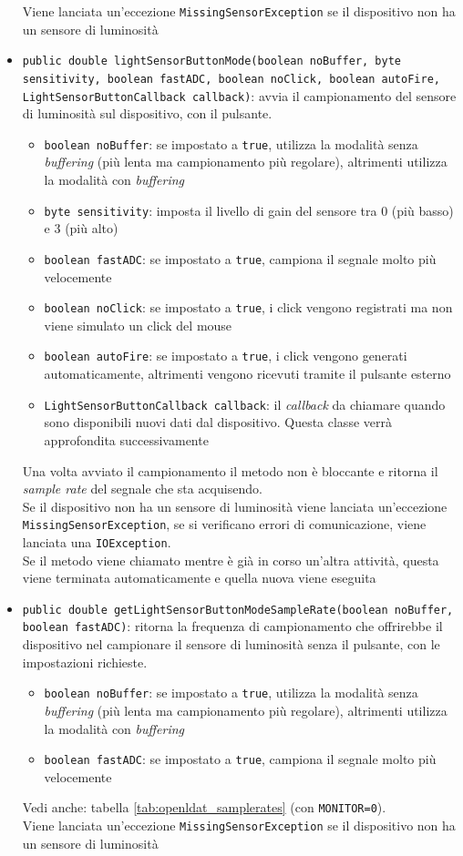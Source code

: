 \begin{itemize}
	Viene lanciata un'eccezione \texttt{MissingSensorException} se il dispositivo non ha un sensore di luminosità
	\item \texttt{public double lightSensorButtonMode(boolean noBuffer, byte sensitivity, boolean fastADC, boolean noClick, boolean autoFire, LightSensorButtonCallback callback)}: avvia il campionamento del sensore di luminosità sul dispositivo, con il pulsante.\begin{itemize}
		\item \texttt{boolean noBuffer}: se impostato a \texttt{true}, utilizza la modalità senza \textit{buffering} (più lenta ma campionamento più regolare), altrimenti utilizza la modalità con \textit{buffering}
		\item \texttt{byte sensitivity}: imposta il livello di gain del sensore tra 0 (più basso) e 3 (più alto)
		\item \texttt{boolean fastADC}: se impostato a \texttt{true}, campiona il segnale molto più velocemente
		\item \texttt{boolean noClick}: se impostato a \texttt{true}, i click vengono registrati ma non viene simulato un click del mouse
		\item \texttt{boolean autoFire}: se impostato a \texttt{true}, i click vengono generati automaticamente, altrimenti vengono ricevuti tramite il pulsante esterno
		\item \texttt{LightSensorButtonCallback callback}: il \textit{callback} da chiamare quando sono disponibili nuovi dati dal dispositivo. Questa classe verrà approfondita successivamente
	\end{itemize}
	Una volta avviato il campionamento il metodo non è bloccante e ritorna il \textit{sample rate} del segnale che sta acquisendo.\\
	Se il dispositivo non ha un sensore di luminosità viene lanciata un'eccezione \texttt{MissingSensorException}, se si verificano errori di comunicazione, viene lanciata una \texttt{IOException}.\\
	Se il metodo viene chiamato mentre è già in corso un'altra attività, questa viene terminata automaticamente e quella nuova viene eseguita
	\item \texttt{public double getLightSensorButtonModeSampleRate(boolean noBuffer, boolean fastADC)}: ritorna la frequenza di campionamento che offrirebbe il dispositivo nel campionare il sensore di luminosità senza il pulsante, con le impostazioni richieste.\begin{itemize}
		\item \texttt{boolean noBuffer}: se impostato a \texttt{true}, utilizza la modalità senza \textit{buffering} (più lenta ma campionamento più regolare), altrimenti utilizza la modalità con \textit{buffering}
		\item \texttt{boolean fastADC}: se impostato a \texttt{true}, campiona il segnale molto più velocemente
	\end{itemize}
	Vedi anche: tabella \ref{tab:openldat_samplerates} (con \texttt{MONITOR=0}).\\
	Viene lanciata un'eccezione \texttt{MissingSensorException} se il dispositivo non ha un sensore di luminosità
\end{itemize}

